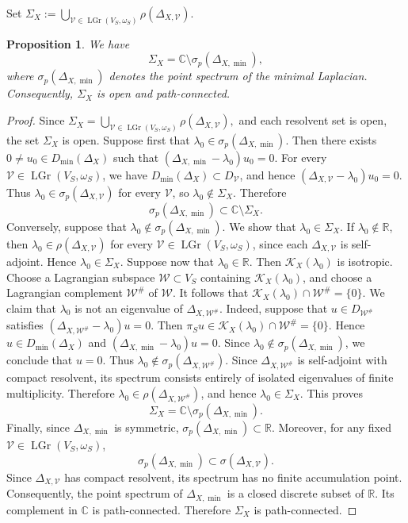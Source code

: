 \documentclass[10pt,a4paper]{amsart}
\newtheorem{prop}[thm]{Proposition}
\numberwithin{equation}{section} \numberwithin{figure}{section}
\newcommand{\mb}[1]{\mathbb{#1}} %
\newcommand{\mc}[1]{\mathcal{#1}}
\begin{document}
Set
\(
    \Sigma_X
    :=
    \bigcup_{\mc V\in\operatorname{LGr}(V_S,\omega_S)}
    \rho(\Delta_{X,\mc V}).
\)

\begin{prop}\label{prop:domain-of-cauchy-data-map}
We have
\[
    \Sigma_X
    =
    \mb C\setminus\sigma_p(\Delta_{X,\min}),
\]
where \(\sigma_p(\Delta_{X,\min})\) denotes the point spectrum of the
minimal Laplacian. Consequently, \(\Sigma_X\) is open and
path-connected.
\end{prop}

\begin{proof}
Since
\(
    \Sigma_X
    =
    \bigcup_{\mc V\in\operatorname{LGr}(V_S,\omega_S)}
    \rho(\Delta_{X,\mc V}),
\)
and each resolvent set is open, the set \(\Sigma_X\) is open.
Suppose first that
\(\lambda_0\in\sigma_p(\Delta_{X,\min})\). Then there exists
\(0\neq u_0\in D_{\min}(\Delta_X)\) such that
\(
    (\Delta_{X,\min}-\lambda_0)u_0=0.
\)
For every
\(\mc V\in\operatorname{LGr}(V_S,\omega_S)\), we have
\(D_{\min}(\Delta_X)\subset D_{\mc V}\), and hence
\(
    (\Delta_{X,\mc V}-\lambda_0)u_0=0.
\)
Thus
\(\lambda_0\in\sigma_p(\Delta_{X,\mc V})\) for every \(\mc V\), so
\(\lambda_0\notin\Sigma_X\). Therefore
\[
    \sigma_p(\Delta_{X,\min})
    \subset
    \mb C\setminus\Sigma_X.
\]
Conversely, suppose that
\(\lambda_0\notin\sigma_p(\Delta_{X,\min})\). We show that
\(\lambda_0\in\Sigma_X\).
If \(\lambda_0\notin\mb R\), then
\(\lambda_0\in\rho(\Delta_{X,\mc V})\) for every
\(\mc V\in\operatorname{LGr}(V_S,\omega_S)\), since each
\(\Delta_{X,\mc V}\) is self-adjoint. Hence
\(\lambda_0\in\Sigma_X\).
Suppose now that \(\lambda_0\in\mb R\). Then
\(\mc K_X(\lambda_0)\) is isotropic. Choose a Lagrangian subspace
\(\mc W\subset V_S\) containing \(\mc K_X(\lambda_0)\), and choose a
Lagrangian complement \(\mc W^\#\) of \(\mc W\). It follows that
\(
    \mc K_X(\lambda_0)\cap\mc W^\#=\{0\}.
\)
We claim that \(\lambda_0\) is not an eigenvalue of
\(\Delta_{X,\mc W^\#}\). Indeed, suppose that
\(u\in D_{\mc W^\#}\) satisfies
\(
    (\Delta_{X,\mc W^\#}-\lambda_0)u=0.
\)
Then
\(
    \pi_Su
    \in
    \mc K_X(\lambda_0)\cap\mc W^\#
    =
    \{0\}.
\)
Hence \(u\in D_{\min}(\Delta_X)\) and
\(
    (\Delta_{X,\min}-\lambda_0)u=0.
\)
Since
\(\lambda_0\notin\sigma_p(\Delta_{X,\min})\), we conclude that
\(u=0\). Thus
\(\lambda_0\notin\sigma_p(\Delta_{X,\mc W^\#})\).
Since \(\Delta_{X,\mc W^\#}\) is self-adjoint with compact resolvent,
its spectrum consists entirely of isolated eigenvalues of finite
multiplicity. Therefore
\(\lambda_0\in\rho(\Delta_{X,\mc W^\#})\), and hence
\(\lambda_0\in\Sigma_X\). This proves
\[
    \Sigma_X
    =
    \mb C\setminus\sigma_p(\Delta_{X,\min}).
\]
Finally, since \(\Delta_{X,\min}\) is symmetric,
\(\sigma_p(\Delta_{X,\min})\subset\mb R\). Moreover, for any fixed
\(\mc V\in\operatorname{LGr}(V_S,\omega_S)\),
\[
    \sigma_p(\Delta_{X,\min})
    \subset
    \sigma(\Delta_{X,\mc V}).
\]
Since \(\Delta_{X,\mc V}\) has compact resolvent, its spectrum has no
finite accumulation point. Consequently, the point spectrum of
\(\Delta_{X,\min}\) is a closed discrete subset of \(\mb R\). Its
complement in \(\mb C\) is path-connected.
Therefore \(\Sigma_X\) is path-connected.
\end{proof}
\end{document}
